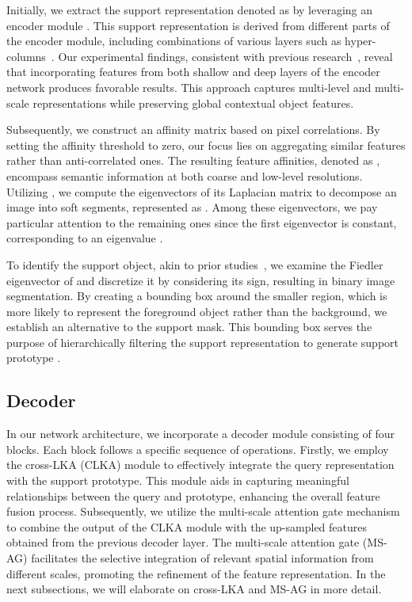 \documentclass[runningheads]{llncs}
\begin{document}
Initially, we extract the support representation denoted as  by leveraging an encoder module . This support representation is derived from different parts of the encoder module, including combinations of various layers such as hyper-columns~\cite{hariharan2015hypercolumns}. Our experimental findings, consistent with previous research~\cite{azad2021texture}, reveal that incorporating features from both shallow and deep layers of the encoder network produces favorable results. This approach captures multi-level and multi-scale representations while preserving global contextual object features.

Subsequently, we construct an affinity matrix based on pixel correlations. By setting the affinity threshold to zero, our focus lies on aggregating similar features rather than anti-correlated ones. The resulting feature affinities, denoted as , encompass semantic information at both coarse and low-level resolutions.
Utilizing , we compute the eigenvectors of its Laplacian matrix  to decompose an image into soft segments, represented as . Among these eigenvectors, we pay particular attention to the remaining ones  since the first eigenvector  is constant, corresponding to an eigenvalue .

To identify the support object, akin to prior studies~\cite{melas2022deep}, we examine the Fiedler eigenvector  of  and discretize it by considering its sign, resulting in binary image segmentation. By creating a bounding box around the smaller region, which is more likely to represent the foreground object rather than the background, we establish an alternative to the support mask. This bounding box serves the purpose of hierarchically filtering the support representation to generate support prototype .



\subsection{Decoder}
In our network architecture, we incorporate a decoder module consisting of four blocks. Each block follows a specific sequence of operations. Firstly, we employ the cross-LKA (CLKA) module to effectively integrate the query representation with the support prototype. This module aids in capturing meaningful relationships between the query and prototype, enhancing the overall feature fusion process. Subsequently, we utilize the multi-scale attention gate mechanism to combine the output of the CLKA module with the up-sampled features obtained from the previous decoder layer. The multi-scale attention gate (MS-AG) facilitates the selective integration of relevant spatial information from different scales, promoting the refinement of the feature representation. In the next subsections, we will elaborate on cross-LKA and MS-AG in more detail.
\end{document}
